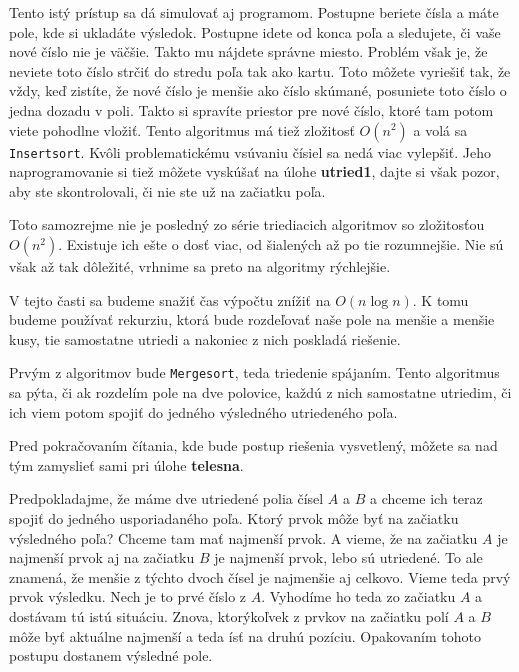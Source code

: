 Tento istý prístup sa dá simulovať aj programom. Postupne beriete čísla a máte pole, kde si ukladáte
výsledok. Postupne idete od konca poľa a sledujete, či vaše nové číslo nie je väčšie. Takto mu
nájdete správne miesto. Problém však je, že neviete toto číslo strčiť do stredu poľa tak ako kartu.
Toto môžete vyriešiť tak, že vždy, keď zistíte, že nové číslo je menšie ako číslo skúmané, posuniete
toto číslo o jedna dozadu v poli. Takto si spravíte priestor pre nové číslo, ktoré tam potom viete
pohodlne vložiť. Tento algoritmus má tiež zložitosť $O(n^2)$ a volá sa \texttt{Insertsort}. Kvôli 
problematickému vsúvaniu čísiel sa nedá viac vylepšiť. Jeho naprogramovanie si tiež môžete vyskúšať
na úlohe \textbf{utried1}, dajte si však pozor, aby ste skontrolovali, či nie ste už na začiatku poľa.

Toto samozrejme nie je posledný zo série triediacich algoritmov so zložitosťou $O(n^2)$. Existuje ich
ešte o dosť viac, od šialených až po tie rozumnejšie. Nie sú však až tak dôležité, vrhnime sa preto
na algoritmy rýchlejšie.


V tejto časti sa budeme snažiť čas výpočtu znížiť na $O(n\log n)$. K tomu budeme používať rekurziu,
ktorá bude rozdeľovať naše pole na menšie a menšie kusy, tie samostatne utriedi a nakoniec z nich
poskladá riešenie.

Prvým z algoritmov bude \texttt{Mergesort}, teda triedenie spájaním. Tento algoritmus sa pýta, či ak
rozdelím pole na dve polovice, každú z nich samostatne utriedim, či ich viem potom spojiť do jedného
výsledného utriedeného poľa.

\medskip

Pred pokračovaním čítania, kde bude postup riešenia vysvetlený, môžete sa nad tým zamyslieť sami pri
úlohe \textbf{telesna}.

\medskip

Predpokladajme, že máme dve utriedené polia čísel $A$ a $B$ a chceme ich teraz spojiť do jedného
usporiadaného poľa. Ktorý prvok môže byť na začiatku výsledného poľa? Chceme tam mať najmenší prvok. A
vieme, že na začiatku $A$ je najmenší prvok aj na začiatku $B$ je najmenší prvok, lebo sú utriedené.
To ale znamená, že menšie z týchto dvoch čísel je najmenšie aj celkovo. Vieme teda prvý prvok
výsledku. Nech je to prvé číslo z $A$. Vyhodíme ho teda zo začiatku $A$ a dostávam tú istú situáciu.
Znova, ktorýkoľvek z prvkov na začiatku polí $A$ a $B$ môže byť aktuálne najmenší a teda ísť na
druhú pozíciu. Opakovaním tohoto postupu dostanem výsledné pole.

